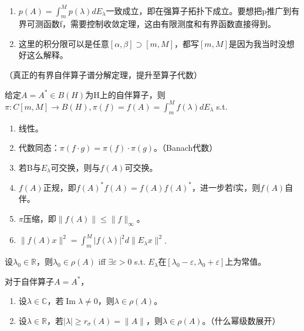 \begin{rmk} \quad

  \begin{enumerate}
    \item $p(A) = \int_m^M p(\lambda) dE_\lambda$一致成立，即在强算子拓扑下成立。要想把p推广到有界可测函数f，需要控制收敛定理，这由有限测度和有界函数直接得到。
    \item 这里的积分限可以是任意$[\alpha, \beta] \supset [m, M]$，都写$[m, M]$是因为我当时没想好这么解释。
  \end{enumerate}
\end{rmk}

\begin{thm}（真正的有界自伴算子谱分解定理，提升至算子代数）

  给定$A = A^{\ast} \in B(H)$为H上的自伴算子，则$\pi: C[m, M] \to B(H), \pi(f) = f(A) = \int_m^M f(\lambda) dE_\lambda$ s.t.
  \begin{enumerate}
    \item 线性。
    \item 代数同态：$\pi(f \cdot g) = \pi(f) \cdot \pi(g)$。（Banach代数）
    \item 若B与$E_\lambda$可交换，则与$f(A)$可交换。
    \item $f(A)$正规，即$f(A)^{\ast}f(A) = f(A) f(A)^{\ast}$，进一步若f实，则$f(A)$自伴。
    \item $\pi$压缩，即$\|f(A)\| \le \|f\|_{\infty}$。
    \item $\|f(A)x\|^2 = \int_m^M |f(\lambda)|^2 d \|E_\lambda x\|^2$.
  \end{enumerate}
\end{thm}

\begin{thm}
  设$\lambda_0 \in \mathbb{R}$，则$\lambda_0 \in \rho(A)$ iff $\exists \varepsilon > 0$ s.t. $E_\lambda$在$[\lambda_0 - \varepsilon, \lambda_0 + \varepsilon]$上为常值。
\end{thm}

\begin{rmk}
  对于自伴算子$A = A^{\ast}$，
  \begin{enumerate}
    \item 设$\lambda \in \mathbb{C}$，若$\operatorname{Im}\lambda \neq 0$，则$\lambda \in \rho(A)$。
    \item 设$\lambda \in \mathbb{R}$，若$|\lambda| \ge r_\sigma(A) = \|A\|$，则$\lambda \in \rho(A)$。（什么幂级数展开）
  \end{enumerate}
\end{rmk}

